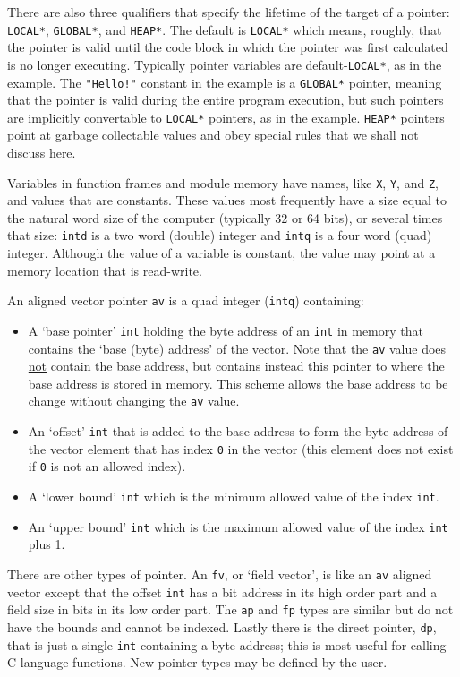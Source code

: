 \documentclass[12pt]{article}
\begin{document}
There are also three qualifiers that specify the lifetime of the target
of a pointer: {\tt *LOCAL*}, {\tt *GLOBAL*}, and {\tt *HEAP*}.  The
default is {\tt *LOCAL*} which means, roughly, that the pointer is valid until
the code block in which the pointer was first calculated is no
longer executing.  Typically pointer variables are default-{\tt *LOCAL*},
as in the example.  The {\tt "Hello!"} constant in the example is
a {\tt *GLOBAL*} pointer, meaning that the pointer is valid during the
entire program execution, but such pointers are implicitly convertable
to {\tt *LOCAL*} pointers, as in the example.  {\tt *HEAP*} pointers
point at garbage collectable values and obey special rules that we
shall not discuss here.

Variables in function frames and module memory
have names, like {\tt X}, {\tt Y}, and {\tt Z}, and values
that are constants.
These values most frequently
have a size equal to the natural
word size of the computer (typically 32 or 64 bits), or
several times that size: {\tt intd} is a two word (double) integer
and {\tt intq} is a four word (quad) integer.
Although the value of a variable is constant, the value may point
at a memory location that is read-write.

An aligned vector pointer {\tt av} is a
quad integer ({\tt intq}) containing:
\begin{itemize}
\item A `base pointer' {\tt int} holding the byte address
of an {\tt int} in memory
that contains the `base (byte) address' of the vector.
Note that the {\tt av} value does \underline{not} contain
the base address, but contains instead this pointer to where
the base address is stored in memory.  This scheme allows
the base address to be change without changing the {\tt av} value.
\item An `offset' {\tt int} that is added to the base address
to form the byte address of the vector element
that has index {\tt 0} in the vector (this element does not
exist if {\tt 0} is not an allowed index).
\item A `lower bound' {\tt int} which is the minimum allowed
value of the index {\tt int}.
\item An `upper bound' {\tt int} which is the maximum allowed
value of the index {\tt int} plus 1.
\end{itemize}

There are other types of pointer.  An {\tt fv}, or `field vector',
is like an {\tt av} aligned
vector except that the offset {\tt int} has a bit address in its
high order part and a field size in bits in its low order part.
The {\tt ap} and {\tt fp} types are
similar but do not have the bounds and cannot be indexed.  Lastly
there is the direct pointer, {\tt dp}, that is just a single {\tt int}
containing a byte address; this is most useful for calling
C language functions.
New pointer types may be defined by the user.
\end{document}
